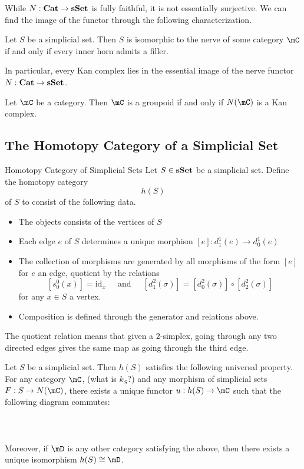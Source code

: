 \documentclass[a4paper]{article}
\begin{document}
While $N:\bold{Cat}\to\bold{sSet}$ is fully faithful, it is not essentially surjective. We can find the image of the functor through the following characterization. 

\begin{prp}{}{} Let $S$ be a simplicial set. Then $S$ is isomorphic to the nerve of some category $\mC$ if and only if every inner horn admits a filler. 
\end{prp}

In particular, every Kan complex lies in the essential image of the nerve functor $N:\bold{Cat}\to\bold{sSet}$. 

\begin{lmm}{}{} Let $\mC$ be a category. Then $\mC$ is a groupoid if and only if $N(\mC)$ is a Kan complex. 
\end{lmm}

\subsection{The Homotopy Category of a Simplicial Set}
\begin{defn}{Homotopy Category of Simplicial Sets}{} Let $S\in\bold{sSet}$ be a simplicial set. Define the homotopy category $$h(S)$$ of $S$ to consist of the following data. 
\begin{itemize}
\item The objects consists of the vertices of $S$
\item Each edge $e$ of $S$ determines a unique morphism $[e]:d_1^1(e)\to d_0^1(e)$
\item The collection of morphisms are generated by all morphisms of the form $[e]$ for $e$ an edge, quotient by the relations $$[s_0^0(x)]=\text{id}_x\;\;\;\;\text{ and }\;\;\;\;[d_1^2(\sigma)]=[d_0^2(\sigma)]\circ[d_2^2(\sigma)]$$ for any $x\in S$ a vertex. 
\item Composition is defined through the generator and relations above. 
\end{itemize}
\end{defn}

The quotient relation means that given a $2$-simplex, going through any two directed edges gives the same map as going through the third edge. 

\begin{prp}{}{} Let $S$ be a simplicial set. Then $h(S)$ satisfies the following universal property. For any category $\mC$, (what is $k_S$?) and any morphism of simplicial sets $F:S\to N(\mC)$, there exists a unique functor $u:h(S)\to\mC$ such that the following diagram commutes: \\~\\
\\~\\
Moreover, if $\mD$ is any other category satisfying the above, then there exists a unique isomorphism $h(S)\cong\mD$. 
\end{prp}
\end{document}

